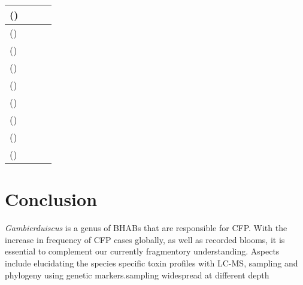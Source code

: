 \documentclass[12pt]{article}
\begin{document}
\begin{longtable}{  | p{3cm} | p{4.5cm} | p{2.95cm} | p{3.95cm} | }
\hline
   \emph{} () &  &  & \\
\hline
  \emph{} () &  &  & \\
\hline
   \emph{} () &  &  & \\
\hline
  \emph{} ()  &  &  & \\
\hline
  \emph{} ()  &  &  & \\
\hline
  \emph{} ()  &  &  & \\
\hline
  \emph{} () &  &  & \\
\hline
   \emph{} () &  &  & \\
\hline
  \emph{} ()  &  &  & \\
\hline
\end{longtable}

\FloatBarrier

\section{Conclusion}
\emph{Gambierduiscus} is a genus of BHABs that are responsible for CFP. With the increase in frequency of CFP cases globally, as well as recorded blooms, it is essential to complement our currently fragmentory understanding. Aspects include elucidating the species specific toxin profiles with LC-MS, sampling and phylogeny using genetic markers.sampling widespread at different depth 

\newpage



\end{document}
